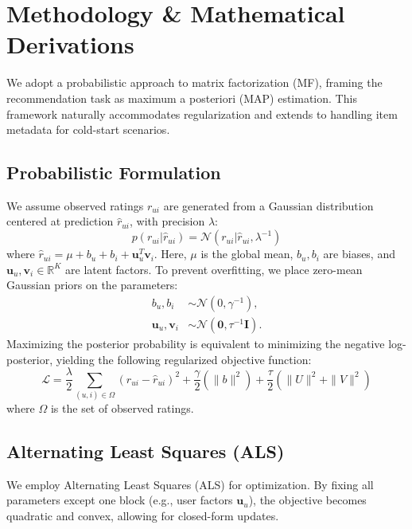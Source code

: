 \documentclass{article}
\theoremstyle{plain}
\theoremstyle{definition}
\theoremstyle{remark}
\begin{document}
\section{Methodology \& Mathematical Derivations} %

We adopt a probabilistic approach to matrix factorization (MF), framing the recommendation task as maximum a posteriori (MAP) estimation. This framework naturally accommodates regularization and extends to handling item metadata for cold-start scenarios.

\subsection{Probabilistic Formulation}
We assume observed ratings $r_{ui}$ are generated from a Gaussian distribution centered at prediction $\hat{r}_{ui}$, with precision $\lambda$:
\begin{equation}
    p(r_{ui} | \hat{r}_{ui}) = \mathcal{N}(r_{ui} | \hat{r}_{ui}, \lambda^{-1})
\end{equation}
where $\hat{r}_{ui} = \mu + b_u + b_i + \mathbf{u}_u^T \mathbf{v}_i$. Here, $\mu$ is the global mean, $b_u, b_i$ are biases, and $\mathbf{u}_u, \mathbf{v}_i \in \mathbb{R}^K$ are latent factors. To prevent overfitting, we place zero-mean Gaussian priors on the parameters:
\begin{align}
    b_u, b_i &\sim \mathcal{N}(0, \gamma^{-1}), \\
    \mathbf{u}_u, \mathbf{v}_i &\sim \mathcal{N}(\mathbf{0}, \tau^{-1}\mathbf{I}).
\end{align}
Maximizing the posterior probability is equivalent to minimizing the negative log-posterior, yielding the following regularized objective function:
\begin{equation} \label{eq:objective}
    \mathcal{L} = \frac{\lambda}{2} \sum_{(u,i) \in \Omega} (r_{ui} - \hat{r}_{ui})^2 + \frac{\gamma}{2} (\|b\|^2) + \frac{\tau}{2} (\|U\|^2 + \|V\|^2)
\end{equation}
where $\Omega$ is the set of observed ratings.

\subsection{Alternating Least Squares (ALS)}
We employ Alternating Least Squares (ALS) for optimization. By fixing all parameters except one block (e.g., user factors $\mathbf{u}_u$), the objective becomes quadratic and convex, allowing for closed-form updates.
\end{document}

